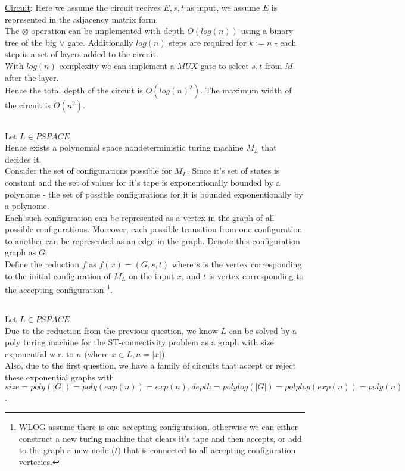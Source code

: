 \underline{Circuit}:
Here we assume the circuit recives $E,s,t$ as input, we assume $E$ is represented
in the adjacency matrix form.\\
The $\otimes$ operation can be implemented with depth $O(log(n))$
using a binary tree of the big $\vee$ gate.
Additionally $log(n)$ steps are required for $k:=n$ - each step
is a set of layers added to the circuit.\\
With $log(n)$ complexity we can implement a $MUX$ gate
to select $s,t$ from $M$ after the layer.\\
Hence the total depth of the circuit is $O(log(n)^2)$.
The maximum width of the circuit is $O(n^2)$.

\subsection{}
Let $L\in PSPACE$.\\
Hence exists a polynomial space nondeterministic turing machine $M_L$ that decides it.\\
Consider the set of configurations possible for $M_L$.
Since it's set of states is constant and the set of values for
it's tape is exponentionally bounded by a polynome - 
the set of possible configurations for it is bounded
exponentionally by a polynome.\\

Each such configuration can be represented as a vertex
in the graph of all possible configurations.
Moreover, each possible transition from one configuration to another
can be represented as an edge in the graph.
Denote this configuration graph as $G$.\\

Define the reduction $f$ as $f(x)=(G, s, t)$
where $s$ is the vertex corresponding to the initial
configuration of $M_L$ on the input $x$, and $t$
is vertex corresponding to the accepting configuration
\footnote{
	WLOG assume there is one accepting configuration,
	otherwise we can either construct a new turing
	machine that clears it's tape and then accepts,
	or add to the graph a new node ($t$) that
	is connected to all accepting configuration vertecies.
}.

\subsection{}
Let $L\in PSPACE$.\\
Due to the reduction from the previous question,
we know $L$ can be solved by a
poly turing machine for the ST-connectivity
problem as a graph with size exponential w.r. to $n$ (where $x\in L, n=|x|$).\\
Also, due to the first question, we have
a family of circuits that accept
or reject these exponential graphs 
with $size=poly(|G|)=poly(exp(n))=exp(n), depth=polylog(|G|)=polylog(exp(n))=poly(n)$.


